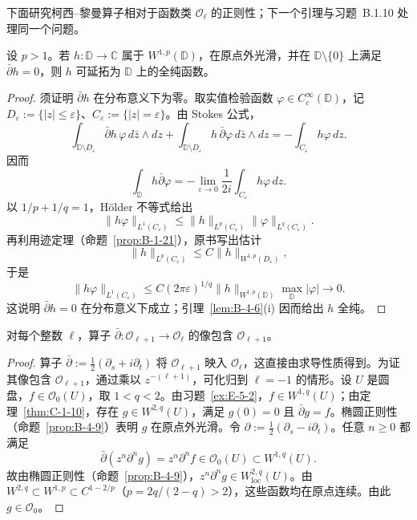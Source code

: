 下面研究柯西--黎曼算子相对于函数类 $\mathcal O_\ell$ 的正则性；下一个引理与习题~B.1.10 处理同一个问题。

\begin{lemma}\label{lem:E-5-6}
设 $p>1$。若 $h:\mathbb D\to\mathbb C$ 属于 $W^{1,p}(\mathbb D)$，在原点外光滑，并在 $\mathbb D\setminus\{0\}$ 上满足 $\bar\partial h=0$，则 $h$ 可延拓为 $\mathbb D$ 上的全纯函数。
\end{lemma}

\begin{proof}
须证明 $\bar\partial h$ 在分布意义下为零。取实值检验函数 $\varphi\in C_c^\infty(\mathbb D)$，记 $D_\varepsilon:=\{|z|\le\varepsilon\}$、$C_\varepsilon:=\{|z|=\varepsilon\}$。由 Stokes 公式，
\[
  \int_{\mathbb D\setminus D_\varepsilon}
     \bar\partial h\,\varphi\,d\bar z\wedge dz
  +\int_{\mathbb D\setminus D_\varepsilon}
     h\,\bar\partial\varphi\,d\bar z\wedge dz
  =-\int_{C_\varepsilon}h\varphi\,dz.
\]
因而
\[
  \int_{\mathbb D}h\bar\partial\varphi
  =-\lim_{\varepsilon\to0}\frac1{2i}
       \int_{C_\varepsilon}h\varphi\,dz.
\]
以 $1/p+1/q=1$，Hölder 不等式给出
\[
  \|h\varphi\|_{L^1(C_\varepsilon)}
  \le\|h\|_{L^p(C_\varepsilon)}
      \|\varphi\|_{L^q(C_\varepsilon)}.
\]
再利用迹定理（命题~\ref{prop:B-1-21}），原书写出估计
\[
  \|h\|_{L^p(C_\varepsilon)}
  \le C\|h\|_{W^{1,p}(D_\varepsilon)},
\]
于是
\[
  \|h\varphi\|_{L^1(C_\varepsilon)}
  \le C(2\pi\varepsilon)^{1/q}
      \|h\|_{W^{1,p}(\mathbb D)}\max_{\mathbb D}|\varphi|
  \longrightarrow0.
\]
这说明 $\bar\partial h=0$ 在分布意义下成立；引理~\ref{lem:B-4-6}(i) 因而给出 $h$ 全纯。
\end{proof}

\begin{lemma}\label{lem:E-5-7}
对每个整数 $\ell$，算子 $\bar\partial:\mathcal O_{\ell+1}\to\mathcal O_\ell$ 的像包含 $\mathcal O_{\ell+1}$。
\end{lemma}

\begin{proof}
算子 $\bar\partial:=\tfrac12(\partial_s+i\partial_t)$ 将 $\mathcal O_{\ell+1}$ 映入 $\mathcal O_\ell$，这直接由求导性质得到。为证其像包含 $\mathcal O_{\ell+1}$，通过乘以 $z^{-(\ell+1)}$，可化归到 $\ell=-1$ 的情形。设 $U$ 是圆盘，$f\in\mathcal O_0(U)$，取 $1<q<2$。由习题~\ref{ex:E-5-2}，$f\in W^{1,q}(U)$；由定理~\ref{thm:C-1-10}，存在 $g\in W^{2,q}(U)$，满足 $g(0)=0$ 且 $\bar\partial g=f$。椭圆正则性（命题~\ref{prop:B-4-9}）表明 $g$ 在原点外光滑。令 $\partial:=\tfrac12(\partial_s-i\partial_t)$。任意 $n\ge0$ 都满足
\[
  \bar\partial(z^n\partial^n g)=z^n\partial^n f
  \in\mathcal O_0(U)\subset W^{1,q}(U).
\]
故由椭圆正则性（命题~\ref{prop:B-4-9}），$z^n\partial^n g\in W^{2,q}_{\mathrm{loc}}(U)$。由 $W^{2,q}\subset W^{1,p}\subset C^{1-2/p}$（$p=2q/(2-q)>2$），这些函数均在原点连续。由此 $g\in\mathcal O_0$。
\end{proof}

